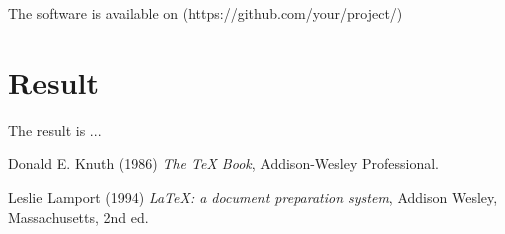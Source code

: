 \documentclass{article}
\begin{document}
The software is available on (https://github.com/your/project/)

\section{Result} %

The result is ...

\begin{thebibliography}{9}
Donald E. Knuth (1986) \emph{The \TeX{} Book}, Addison-Wesley Professional.

Leslie Lamport (1994) \emph{\LaTeX: a document preparation system}, Addison
Wesley, Massachusetts, 2nd ed.
\end{thebibliography}
\end{document}
